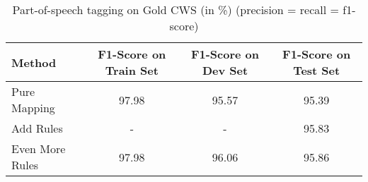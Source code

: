\begin{table}[htbp!]
    \centering
    \begin{tabular}{lccc}
    \toprule
        Method          & F1-Score on Train Set  & F1-Score on Dev Set   & F1-Score on Test Set \\
    \midrule
        Pure Mapping    & 97.98                  & 95.57                 & 95.39                \\
        Add Rules       & -                      & -                     & 95.83                \\
        Even More Rules & 97.98                  & 96.06                 & 95.86                \\
    \bottomrule
    \end{tabular}
\caption{Part-of-speech tagging on Gold CWS (in \%) (precision = recall = f1-score)}
\label{tab:pos_on_gold_cws}
\end{table}